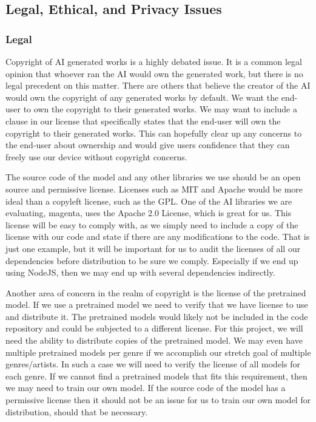 \subsection{Legal, Ethical, and Privacy Issues}

\subsubsection{Legal}

Copyright of AI generated works is a highly debated issue. It is a common legal opinion
that whoever ran the AI would own the generated work, but there is no legal precedent on
this matter. There are others that believe the creator of the AI would own the copyright
of any generated works by default. We want the end-user to own the copyright to their
generated works. We may want to include a clause in our license that specifically states
that the end-user will own the copyright to their generated works. This can hopefully
clear up any concerns to the end-user about ownership and would give users confidence that
they can freely use our device without copyright concerns.

The source code of the model and any other libraries we use should be an open source and
permissive license. Licenses such as MIT and Apache would be more ideal than a copyleft
license, such as the GPL. One of the AI libraries we are evaluating, magenta, uses the
Apache 2.0 License, which is great for us. This license will be easy to comply with, as we
simply need to include a copy of the license with our code and state if there are any
modifications to the code.  That is just one example, but it will be important for us to
audit the licenses of all our dependencies before distribution to be sure we comply.
Especially if we end up using NodeJS, then we may end up with several dependencies
indirectly.

Another area of concern in the realm of copyright is the license of the pretrained model.
If we use a pretrained model we need to verify that we have license to use and distribute
it. The pretrained models would likely not be included in the code repository and could be
subjected to a different license. For this project, we will need the ability to distribute
copies of the pretrained model. We may even have multiple pretrained models per genre if
we accomplish our stretch goal of multiple genres/artists. In such a case we will need to
verify the license of all models for each genre. If we cannot find a pretrained models
that fits this requirement, then we may need to train our own model. If the source code of
the model has a permissive license then it should not be an issue for us to train our own
model for distribution, should that be necessary.

